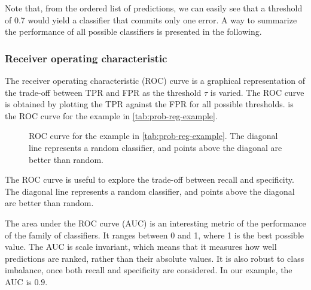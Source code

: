 Note that, from the ordered list of predictions, we can easily see that a threshold of 0.7
would yield a classifier that commits only one error.  A way to summarize the performance
of all possible classifiers is presented in the following.

\subsubsection{Receiver operating characteristic}

The receiver operating characteristic (ROC) curve is a graphical representation of the
trade-off between TPR and FPR as the threshold
$\tau$ is varied.  The ROC curve is obtained by plotting the TPR against the FPR for all
possible thresholds.   is the ROC curve for the example in
\cref{tab:prob-reg-example}.

\begin{figure}
  \centering
  \caption{
  ROC curve for the example in \cref{tab:prob-reg-example}.  The diagonal line represents
  a random classifier, and points above the diagonal are better than random.
  }
  \label{fig:roc-example}
\end{figure}

The ROC curve is useful to explore the trade-off between recall and specificity.  The
diagonal line represents a random classifier, and points above the diagonal are better
than random.

The area under the ROC curve (AUC) is an interesting metric of the performance of the
family of classifiers.  It ranges between 0 and 1, where 1 is the best possible value.
The AUC is scale invariant, which means that it measures how well
predictions are ranked, rather than their absolute values.  It is also robust to
class imbalance, once both recall and specificity are considered.
In our example, the AUC is $0.9$.

